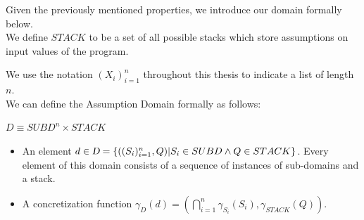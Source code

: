 \documentclass[10pt]{report}
\begin{document}
Given the previously mentioned properties, we introduce our domain formally below. \\
  

We define $STACK$ to be a set of all possible stacks which store assumptions on input values of the program.

We use the notation $ (X_{i})_{i=1}^{n} $ throughout this thesis to indicate a list of length $ n $.  \\

We can define the Assumption Domain formally as follows: \\
\begin{center}
	$D \equiv SUBD^{n} \times STACK$\\	
\end{center}
\begin{itemize}
	\item An element $d \in \textsl{D} = \lbrace ((S_{i})_{i=1}^{n}, Q) \vert S_{i} \in SUBD \wedge Q \in STACK \rbrace$. Every element of this domain consists of a sequence of instances of sub-domains and a stack.
	\item A concretization function $\gamma_{D}(d) =( \bigcap\limits_{i=1}^{n}\gamma_{S_{i}}(S_{i}), \gamma_{STACK}(Q)).$ 
	 

\end{itemize}
\end{document}
